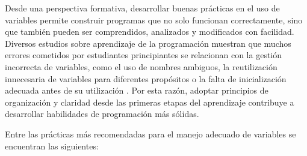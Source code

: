 \documentclass[12pt,twoside]{book}
\begin{document}
						Desde una perspectiva formativa, desarrollar buenas prácticas en el uso de variables permite construir programas que no solo funcionan correctamente, sino que también pueden ser comprendidos, analizados y modificados con facilidad. Diversos estudios sobre aprendizaje de la programación muestran que muchos errores cometidos por estudiantes principiantes se relacionan con la gestión incorrecta de variables, como el uso de nombres ambiguos, la reutilización innecesaria de variables para diferentes propósitos o la falta de inicialización adecuada antes de su utilización \cite{Qian2018Students,Robins2003Learning,Lister2004Learning}. Por esta razón, adoptar principios de organización y claridad desde las primeras etapas del aprendizaje contribuye a desarrollar habilidades de programación más sólidas.
						
						Entre las prácticas más recomendadas para el manejo adecuado de variables se encuentran las siguientes:
						
\end{document}
